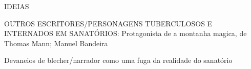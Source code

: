 IDEIAS

OUTROS ESCRITORES/PERSONAGENS TUBERCULOSOS E INTERNADOS EM SANATÓRIOS: Protagonista de a montanha magica, de Thomas Mann; Manuel Bandeira

Devaneios de blecher/narrador como uma fuga da realidade do sanatório